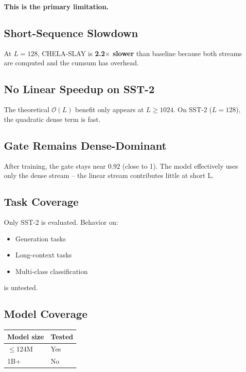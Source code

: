 \textbf{This is the primary limitation.}

\subsection{Short-Sequence Slowdown}

At $L = 128$, CHELA-SLAY is \textbf{2.2$\times$ slower} than baseline because 
both streams are computed and the cumsum has overhead.

\subsection{No Linear Speedup on SST-2}

The theoretical $\mathcal{O}(L)$ benefit only appears at $L \geq 
1024$. On SST-2 ($L = 128$), the quadratic dense term is fast.

\subsection{Gate Remains Dense-Dominant}

After training, the gate stays near $0.92$ (close to 1). The 
model effectively uses only the dense stream -- the linear stream 
contributes little at short L.

\subsection{Task Coverage}

Only SST-2 is evaluated. Behavior on:
\begin{itemize}
\item Generation tasks
\item Long-context tasks
\item Multi-class classification

\end{itemize}
is untested.

\subsection{Model Coverage}

\begin{table}[H]
\centering
\small
\begin{tabular}{ll}
\toprule
\textbf{Model size} & \textbf{Tested} \\
\midrule
$\le$124M & Yes \\
1B+ & No \\
\bottomrule
\end{tabular}
\end{table}

